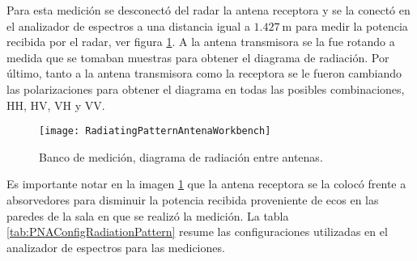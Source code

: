 Para esta medición se desconectó del radar la antena receptora y se la conectó en el analizador de espectros a una distancia igual a $\SI{1.427}{\meter}$ para medir la potencia recibida por el radar, ver figura \ref{fig:radiationPatternConnections}. A la antena transmisora se la fue rotando a medida que se tomaban muestras para obtener el diagrama de radiación. Por último, tanto a la antena transmisora como la receptora se le fueron cambiando las polarizaciones para obtener el diagrama en todas las posibles combinaciones, HH, HV, VH y VV.
\begin{figure}[htb]
 \centering
 \texttt{[image: RadiatingPatternAntenaWorkbench]}
 \caption{Banco de medición, diagrama de radiación entre antenas.}
 \label{fig:radiationPatternConnections}
\end{figure}

Es importante notar en la imagen \ref{fig:radiationPatternConnections} que la antena receptora se la colocó frente a absorvedores para disminuir la potencia recibida proveniente de ecos en las paredes de la sala en que se realizó la medición. La tabla \ref{tab:PNAConfigRadiationPattern} resume las configuraciones utilizadas en el analizador de espectros para las mediciones.

